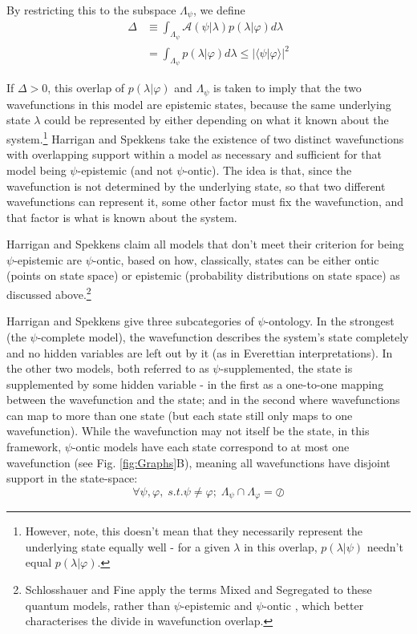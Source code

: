 \documentclass[superscriptaddress, floatfix,nofootinbib,12pt]{revtex4-2}
\newcommand{\braket}[2]{\langle #1|#2 \rangle}
\begin{document}
By restricting this to the subspace $\Lambda_\psi$, we define
\begin{equation}
\begin{split}
\Delta&\equiv\int_{\Lambda_\psi}\mathcal{A}(\psi\vert\lambda) p(\lambda\vert\varphi) d\lambda\\
    &=\int_{\Lambda_\psi} p(\lambda\vert\varphi) d\lambda\leq\vert\braket{\psi}{\varphi}\vert^2
    \end{split}
\end{equation}

If $\Delta>0$, this overlap of $p(\lambda\vert\varphi)$ and $\Lambda_\psi$ is taken to imply that the two wavefunctions in this model are epistemic states, because the same underlying state $\lambda$ could be represented by either depending on what it known about the system.\footnote{However, note, this doesn't mean that they necessarily represent the underlying state equally well - for a given $\lambda$ in this overlap, $p(\lambda\vert\psi)$ needn't equal $p(\lambda\vert\varphi)$.} Harrigan and Spekkens take the existence of two distinct wavefunctions with overlapping support within a model as necessary and sufficient for that model being $\psi$-epistemic (and not $\psi$-ontic). The idea is that, since the wavefunction is not determined by the underlying state, so that two different wavefunctions can represent it, some other factor must fix the wavefunction, and that factor is what is known about the system.

Harrigan and Spekkens claim all models that don't meet their criterion for being $\psi$-epistemic are $\psi$-ontic, based on how, classically, states can be either ontic (points on state space) or epistemic (probability distributions on state space) as discussed above.\footnote{Schlosshauer and Fine apply the terms Mixed and Segregated to these quantum models, rather than $\psi$-epistemic and $\psi$-ontic \cite{Schlosshauer2012Implications}, which better characterises the divide in wavefunction overlap.}

Harrigan and Spekkens give three subcategories of $\psi$-ontology. In the strongest (the $\psi$-complete model), the wavefunction describes the system's state completely and no hidden variables are left out by it (as in Everettian interpretations). In the other two models, both referred to as $\psi$-supplemented, the state is supplemented by some hidden variable - in the first as a one-to-one mapping between the wavefunction and the state; and in the second where wavefunctions can map to more than one state (but each state still only maps to one wavefunction). While the wavefunction may not itself be the state, in this framework, $\psi$-ontic models have each state correspond to at most one wavefunction (see Fig. \ref{fig:Graphs}B), meaning all wavefunctions have disjoint support in the state-space:
\begin{equation}
    \forall\psi,\varphi,\;s.t.\psi\neq\varphi;\;\Lambda_{\psi}\cap\Lambda_{\varphi}=\oslash
\end{equation}
\end{document}
